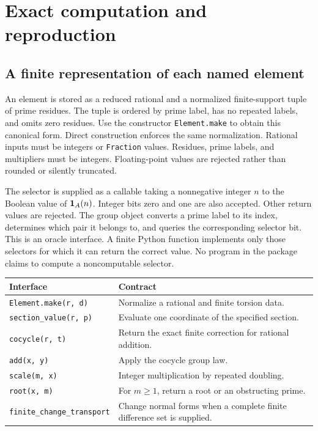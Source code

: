 \chapter{Exact computation and reproduction}
\label{app:implementation}


\section{A finite representation of each named element}
An element is stored as a reduced rational and a normalized finite-support tuple of prime residues. The tuple is ordered by prime label, has no repeated labels, and omits zero residues. Use the constructor \texttt{Element.make} to obtain this canonical form. Direct construction enforces the same normalization. Rational inputs must be integers or \texttt{Fraction} values. Residues, prime labels, and multipliers must be integers. Floating-point values are rejected rather than rounded or silently truncated.

The selector is supplied as a callable taking a nonnegative integer $n$ to the Boolean value of $\mathbf 1_A(n)$. Integer bits zero and one are also accepted. Other return values are rejected. The group object converts a prime label to its index, determines which pair it belongs to, and queries the corresponding selector bit. This is an oracle interface. A finite Python function implements only those selectors for which it can return the correct value. No program in the package claims to compute a noncomputable selector.

\begin{center}
\begin{tabularx}{\textwidth}{@{}p{}X@{}}
\toprule
Interface&Contract\\\midrule
\texttt{Element.make(r, d)}&Normalize a rational and finite torsion data.\\
\texttt{section\_value(r, p)}&Evaluate one coordinate of the specified section.\\
\texttt{cocycle(r, t)}&Return the exact finite correction for rational addition.\\
\texttt{add(x, y)}&Apply the cocycle group law.\\
\texttt{scale(m, x)}&Integer multiplication by repeated doubling.\\
\texttt{root(x, m)}&For $m\ge1$, return a root or an obstructing prime.\\
\texttt{finite\_change\_transport}&Change normal forms when a complete finite difference set is supplied.\\\bottomrule
\end{tabularx}
\end{center}


